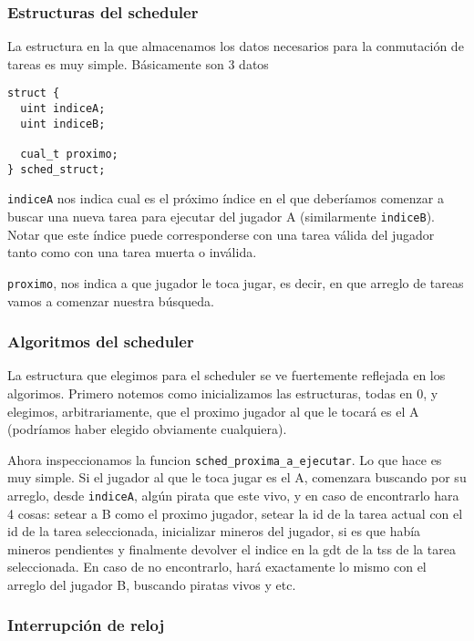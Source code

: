 
\subsubsection*{Estructuras del scheduler}
 
La estructura en la que almacenamos los datos necesarios para la conmutación de tareas es muy simple. Básicamente son 3 datos

\begin{lstlisting}
struct {
  uint indiceA;
  uint indiceB;

  cual_t proximo;
} sched_struct;
\end{lstlisting}


\texttt{indiceA} nos indica cual es el próximo índice en el que deberíamos comenzar a buscar una nueva tarea para ejecutar del jugador A (similarmente \texttt{indiceB}). Notar que este índice puede corresponderse con una tarea válida del jugador tanto como con una tarea muerta o inválida.
 
\texttt{proximo}, nos indica a que jugador le toca jugar, es decir, en que arreglo de tareas vamos a comenzar nuestra búsqueda.
 
\subsubsection*{Algoritmos del scheduler}
 
La estructura que elegimos para el scheduler se ve fuertemente reflejada en los algorimos. Primero notemos como inicializamos las estructuras, todas en 0, y elegimos, arbitrariamente, que el proximo jugador al que le tocará es el A (podríamos haber elegido obviamente cualquiera).
 
Ahora inspeccionamos la funcion \texttt{sched_proxima_a_ejecutar}. Lo que hace es muy simple. 
Si el jugador al que le toca jugar es el A, comenzara buscando por su arreglo, desde \texttt{indiceA}, algún pirata que este vivo, y en caso de encontrarlo hara 4 cosas: setear a B como el proximo jugador, setear la id de la tarea actual con el id de la tarea seleccionada, inicializar mineros del jugador, si es que había mineros pendientes y finalmente devolver el indice en la gdt de la tss de la tarea seleccionada.
En caso de no encontrarlo, hará exactamente lo mismo con el arreglo del jugador B, buscando piratas vivos y etc.
 
\subsubsection*{Interrupción de reloj}
 
